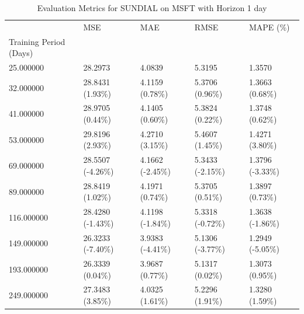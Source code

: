 \begin{table}
\caption{Evaluation Metrics for SUNDIAL on MSFT with Horizon 1 day}
\label{tab:sundial_MSFT_h1_metrics}
\begin{tabular}{lllll}
\toprule
 & MSE & MAE & RMSE & MAPE (\%) \\
Training Period (Days) &  &  &  &  \\
\midrule
25.000000 & 28.2973 & 4.0839 & 5.3195 & 1.3570 \\
32.000000 & 28.8431 (1.93\%) & 4.1159 (0.78\%) & 5.3706 (0.96\%) & 1.3663 (0.68\%) \\
41.000000 & 28.9705 (0.44\%) & 4.1405 (0.60\%) & 5.3824 (0.22\%) & 1.3748 (0.62\%) \\
53.000000 & 29.8196 (2.93\%) & 4.2710 (3.15\%) & 5.4607 (1.45\%) & 1.4271 (3.80\%) \\
69.000000 & 28.5507 (-4.26\%) & 4.1662 (-2.45\%) & 5.3433 (-2.15\%) & 1.3796 (-3.33\%) \\
89.000000 & 28.8419 (1.02\%) & 4.1971 (0.74\%) & 5.3705 (0.51\%) & 1.3897 (0.73\%) \\
116.000000 & 28.4280 (-1.43\%) & 4.1198 (-1.84\%) & 5.3318 (-0.72\%) & 1.3638 (-1.86\%) \\
149.000000 & 26.3233 (-7.40\%) & 3.9383 (-4.41\%) & 5.1306 (-3.77\%) & 1.2949 (-5.05\%) \\
193.000000 & 26.3339 (0.04\%) & 3.9687 (0.77\%) & 5.1317 (0.02\%) & 1.3073 (0.95\%) \\
249.000000 & 27.3483 (3.85\%) & 4.0325 (1.61\%) & 5.2296 (1.91\%) & 1.3280 (1.59\%) \\
\bottomrule
\end{tabular}
\end{table}
